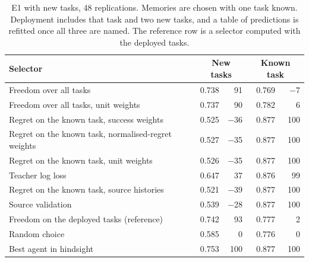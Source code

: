 \begin{table}[t]
\centering
\caption{E1 with new tasks, 48 replications. Memories are chosen with one task known. Deployment includes that task and two new tasks, and a table of predictions is refitted once all three are named. The reference row is a selector computed with the deployed tasks.}
\label{tab:ds}
\small
\begin{tabular}{@{}lrrrr@{}}
\toprule
Selector & \multicolumn{2}{c}{New tasks} & \multicolumn{2}{c}{Known task} \\
\midrule
Freedom over all tasks & 0.738 & 91 & 0.769 & $-$7 \\
Freedom over all tasks, unit weights & 0.737 & 90 & 0.782 & 6 \\
Regret on the known task, success weights & 0.525 & $-$36 & 0.877 & 100 \\
Regret on the known task, normalised-regret weights & 0.527 & $-$35 & 0.877 & 100 \\
Regret on the known task, unit weights & 0.526 & $-$35 & 0.877 & 100 \\
Teacher log loss & 0.647 & 37 & 0.876 & 99 \\
Regret on the known task, source histories & 0.521 & $-$39 & 0.877 & 100 \\
Source validation & 0.539 & $-$28 & 0.877 & 100 \\
Freedom on the deployed tasks (reference) & 0.742 & 93 & 0.777 & 2 \\
Random choice & 0.585 & 0 & 0.776 & 0 \\
Best agent in hindsight & 0.753 & 100 & 0.877 & 100 \\
\bottomrule
\end{tabular}
\end{table}

